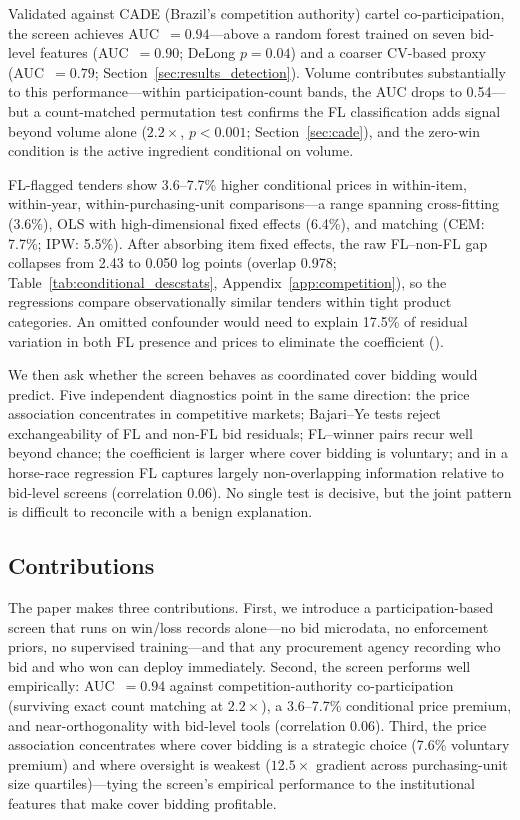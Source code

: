 Validated against CADE (Brazil's competition authority) cartel
co-participation, the screen achieves AUC~$= 0.94$---above a
random forest trained on seven bid-level features
(AUC~$= 0.90$; DeLong $p = 0.04$) and a coarser CV-based proxy
(AUC~$= 0.79$; Section~\ref{sec:results_detection}). Volume
contributes substantially to this performance---within
participation-count bands, the AUC drops to 0.54---but a
count-matched permutation test confirms the FL classification adds
signal beyond volume alone
($2.2\times$, $p < 0.001$; Section~\ref{sec:cade}), and the
zero-win condition is the active ingredient conditional on volume.

FL-flagged tenders show 3.6--7.7\% higher conditional prices in
within-item, within-year, within-purchasing-unit comparisons---a
range spanning cross-fitting (3.6\%), OLS with high-dimensional
fixed effects (6.4\%), and matching (CEM: 7.7\%; IPW: 5.5\%). After
absorbing item fixed effects, the raw FL--non-FL gap collapses from
2.43 to 0.050 log points (overlap 0.978;
Table~\ref{tab:conditional_descstats},
Appendix~\ref{app:competition}), so the regressions compare
observationally similar tenders within tight product categories. An
omitted confounder would need to explain 17.5\% of residual variation
in both FL presence and prices to eliminate the coefficient
(\citealt{cinelli2020making}).

We then ask whether the screen behaves as coordinated cover bidding
would predict. Five independent diagnostics point in the same direction: the price
association concentrates in competitive markets; Bajari--Ye tests
reject exchangeability of FL and non-FL bid residuals; FL--winner
pairs recur well beyond chance; the coefficient is larger where
cover bidding is voluntary; and in a horse-race regression FL
captures largely non-overlapping information relative to bid-level
screens (correlation 0.06). No single test is decisive, but the
joint pattern is difficult to reconcile with a benign explanation.

\subsection{Contributions}

The paper makes three contributions. First, we introduce a
participation-based screen that runs on win/loss records alone---no
bid microdata, no enforcement priors, no supervised training---and
that any procurement agency recording who bid and who won can deploy
immediately. Second, the screen performs well empirically:
AUC~$= 0.94$ against competition-authority co-participation
(surviving exact count matching at $2.2\times$), a 3.6--7.7\%
conditional price premium, and near-orthogonality with bid-level
tools (correlation 0.06). Third, the price association concentrates
where cover bidding is a strategic choice (7.6\% voluntary premium)
and where oversight is weakest ($12.5\times$ gradient across
purchasing-unit size quartiles)---tying the screen's empirical
performance to the institutional features that make cover bidding
profitable.

